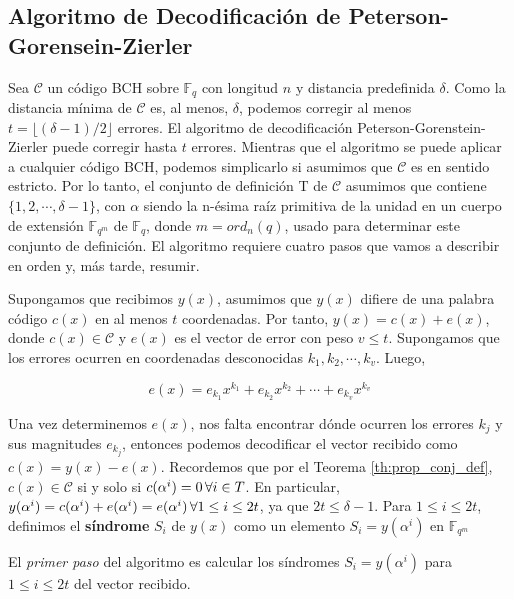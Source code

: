 \subsection{Algoritmo de Decodificación de Peterson-Gorensein-Zierler}

Sea $\mathcal{C}$ un código BCH sobre $\mathbb{F}_q$ con longitud $n$ y distancia predefinida $\delta$. Como la distancia mínima de $\mathcal{C}$ es, al menos, $\delta$, podemos corregir al menos $t = \lfloor (\delta-1)/2 \rfloor$ errores. El algoritmo de decodificación Peterson-Gorenstein-Zierler puede corregir hasta $t$ errores. Mientras que el algoritmo se puede aplicar a cualquier código BCH, podemos simplicarlo si asumimos que $\mathcal{C}$ es en sentido estricto. Por lo tanto, el conjunto de definición T de $\mathcal{C}$ asumimos que contiene $\{ 1,2,\cdots,\delta-1 \}$, con $\alpha$ siendo la n-ésima raíz primitiva de la unidad en un cuerpo de extensión $\mathbb{F}_{q^m}$ de $\mathbb{F}_q$, donde $m = ord_n(q)$, usado para determinar este conjunto de definición. El algoritmo requiere cuatro pasos que vamos a describir  en orden y, más tarde, resumir.


Supongamos que recibimos $y(x)$, asumimos que $y(x)$ difiere de una palabra código $c(x)$ en al menos $t$ coordenadas. Por tanto, $y(x) = c(x) + e(x)$, donde $c(x) \in \mathcal{C}$ y $e(x)$ es el vector de error con peso $v \leq t$. Supongamos que los errores ocurren en coordenadas desconocidas $k_1,k_2,\cdots,k_v$. Luego,

\[
e(x) = e_{k_1}x^{k_1} + e_{k_2}x^{k_2} + \cdots + e_{k_v}x^{k_v}
\]

Una vez determinemos $e(x)$, nos falta encontrar dónde ocurren los errores $k_j$ y sus magnitudes $e_{k_j}$, entonces podemos decodificar el vector recibido como $c(x) = y(x) - e(x)$. Recordemos que por el Teorema \ref{th:prop_conj_def}, $c(x) \in \mathcal{C}$ si y solo si $c(\alpha^i) = 0 \thinspace \forall i \in T$. En particular, $y(\alpha^i) = c(\alpha^i) + e(\alpha^i) = e(\alpha^i) \thinspace \forall 1 \leq i \leq 2t$, ya que $2t \leq \delta-1$. Para $1 \leq i \leq 2t$, definimos el \textbf{síndrome} $S_i$ de $y(x)$ como un elemento $S_i = y(\alpha^i)$ en $\mathbb{F}_{q^m}$

El \textit{primer paso} del algoritmo es calcular los síndromes $S_i = y(\alpha^i)$ para $1 \leq i \leq 2t$ del vector recibido.


